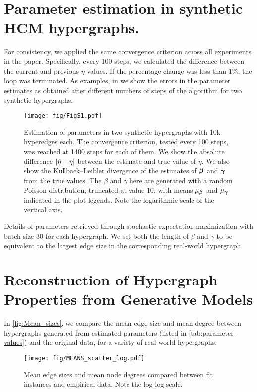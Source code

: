 \section{Parameter estimation in synthetic HCM hypergraphs.}
For consistency, we applied the same convergence criterion across all experiments in the paper. Specifically, every 100 steps, we calculated the difference between the current and previous $\eta$ values. If the percentage change was less than $1\%$, the loop was terminated. As examples, in  we show the errors in the parameter estimates as obtained after different numbers of steps of the algorithm for two synthetic hypergraphs.


\begin{figure*}[h!]
    \centering
    \texttt{[image: fig/FigS1.pdf]}
    \caption{Estimation of parameters in two synthetic hypergraphs with 10k hyperedges %
    each. The convergence criterion, tested every 100 steps, was reached at 1400 steps for each of them. 
    We show the absolute difference $\left\lvert \hat{\eta} - \eta \right\rvert$ between the estimate and true value of $\eta$. 
    We also show the Kullback--Leibler divergence of the estimates of $\boldsymbol{\beta}$ and $\boldsymbol{\gamma}$ from the true values.    
    The $\beta$ and $\gamma$ here are generated with a random Poisson distribution, truncated at value $10$, with means $\mu_{\boldsymbol{\beta}}$ and $\mu_{\boldsymbol{\gamma}}$ indicated in the plot legends. 
    Note the logarithmic scale of the vertical axis.}
    \label{fig:accuracy}
\end{figure*}


\begin{table*}[h!]
    \centering
     
    \caption{Details of parameters retrieved through stochastic expectation maximization with batch size 30 for each hypergraph. We set both the length of $\beta$ and $\gamma$ to be equivalent to the largest edge size in the corresponding real-world hypergraph.}
    \label{tab:parameter-values}
\end{table*}
    


\section{Reconstruction of Hypergraph Properties from Generative Models}

In \autoref{fig:Mean_sizes}, we compare the mean edge size and mean degree between hypergraphs generated from estimated parameters (listed in \autoref{tab:parameter-values}) and the original data, for a variety of real-world hypergraphs.
\begin{figure*}[h!]
    \centering
    \texttt{[image: fig/MEANS\_scatter\_log.pdf]}
    \caption{Mean edge sizes and mean node degrees compared between fit \model instances and empirical data.
    Note the log-log scale.}
    \label{fig:Mean_sizes}
\end{figure*}


